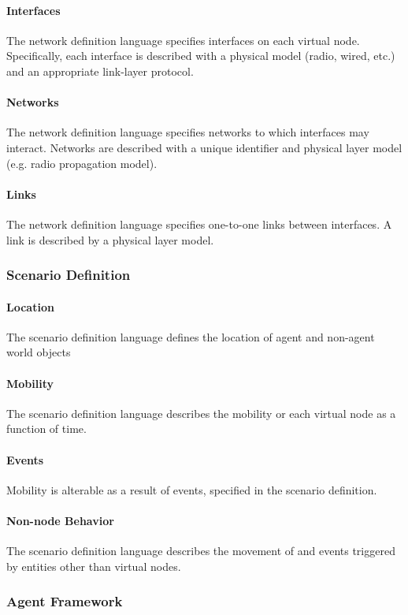 \documentclass[titlepage]{article}
\begin{document}
\paragraph{Interfaces} The network definition language specifies interfaces on each virtual node.  Specifically,
each interface is described with a physical model (radio, wired, etc.) and an appropriate link-layer protocol.

\paragraph{Networks} The network definition language specifies networks to which interfaces may interact.  Networks
are described with a unique identifier and physical layer model (e.g. radio propagation model).

\paragraph{Links} The network definition language specifies one-to-one links between interfaces.  A link is
described by a physical layer model.

\subsubsection{Scenario Definition}
\paragraph{Location} The scenario definition language defines the location of agent and non-agent world objects
\paragraph{Mobility} The scenario definition language describes the mobility or each virtual node as a function of
time.
\paragraph{Events} Mobility is alterable as a result of events, specified in the scenario definition.
\paragraph{Non-node Behavior} The scenario definition language describes the movement of and events triggered by
entities other than virtual nodes.

\subsubsection{Agent Framework}
\end{document}
